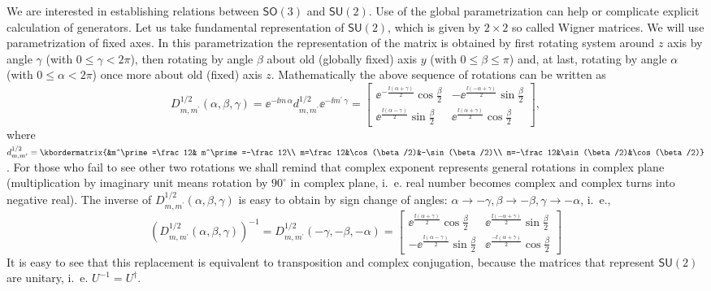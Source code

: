 \begin{example}
\begin{example}
We are interested in establishing relations between $\mathsf{SO}(3)$
and $\mathsf{SU}(2)$. Use of the global parametrization can help
or complicate explicit calculation of generators. Let us take
fundamental representation of $\mathsf{SU}(2)$, which is given by
$2\times 2$ so called Wigner matrices. We will use parametrization
of fixed axes. In this parametrization the representation of the
matrix is obtained by first rotating system around $z$ axis by
angle $\gamma$ (with $0\le\gamma< 2\pi$), then rotating by angle
$\beta$ about old (globally fixed) axis $y$ (with
$0\le\beta\le\pi$) and, at last, rotating by angle $\alpha$ (with
$0\le\alpha< 2\pi$) once more about old (fixed) axis $z$.
Mathematically the above sequence of rotations can be written as
\renewcommand{\kbldelim}{[}%
\renewcommand{\kbrdelim}{]}%
\[D^{1/2}_{m,m^\prime}(\alpha,\beta,\gamma)=\ee^{-\ii m\, \alpha} d^{1/2}_{m,m^\prime} \ee^{-\ii m^\prime\, \gamma} =
\begin{bmatrix}
  \ee^{-\frac{\ii (\alpha+\gamma)}{2}} \cos \frac{\beta}{2} & -\ee^{\frac{\ii (-\alpha+\gamma)}{2}}\sin \frac{\beta}{2}\\
  \ee^{\frac{\ii (\alpha-\gamma)}{2}}\sin \frac{\beta}{2} & \ee^{\frac{\ii (\alpha+\gamma)}{2}} \cos \frac{\beta}{2}
\end{bmatrix},
\]
where $d^{1/2}_{m,m^\prime}=
\kbordermatrix{&m^\prime=\frac12& m^\prime=-\frac12\\
m=\frac12&\cos(\beta/2)&-\sin(\beta/2)\\
m=-\frac12&\sin(\beta/2)&\cos(\beta/2)}$.  For those who fail to see
other two rotations we shall remind that complex exponent
represents general rotations in complex plane (multiplication by
imaginary unit means rotation by $90^{\circ}$ in complex plane,
i.~e. real number becomes complex  and complex
 turns into negative real). The inverse of
$D^{1/2}_{m,m^\prime}(\alpha,\beta,\gamma)$ is easy to obtain by
sign change of angles: $\alpha \rightarrow -\gamma, \beta
\rightarrow -\beta, \gamma \rightarrow -\alpha $, i.~e.,
\[
  \left(D^{1/2}_{m,m^\prime}(\alpha,\beta,\gamma)\right)^{-1}=D^{1/2}_{m,m^\prime}(-\gamma,-\beta,-\alpha)= \begin{bmatrix}
  \ee^{\frac{\ii (\alpha+\gamma)}{2}} \cos \frac{\beta}{2} & \ee^{\frac{\ii (-\alpha+\gamma)}{2}}\sin \frac{\beta}{2}\\
  -\ee^{\frac{\ii (\alpha-\gamma)}{2}}\sin \frac{\beta}{2} & \ee^{\frac{-\ii (\alpha+\gamma)}{2}} \cos \frac{\beta}{2}
\end{bmatrix}
\]
It is easy to see that this replacement is equivalent to
transposition and complex conjugation, because the matrices that
represent  $\mathsf{SU}(2)$ are unitary, i.~e. $U^{-1}=U^\dagger$.


\end{example}
\end{example}
